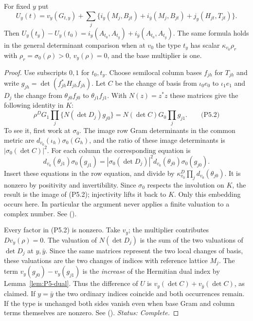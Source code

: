 \begin{proposition}\label{prop:P5-local}
For fixed $y$ put
\[
 U_y(t)=v_y(G_{t,y})
       +\sum_j\{i_y(M_j,B_{jt})+i_{\bar y}(M_j,B_{jt})+j_y(H_{jt},T_{jt})\}.
\]
Then $U_y(t_y)-U_y(t_0)=i_y(A_{t_0},A_{t_y})+i_{\bar y}(A_{t_0},A_{t_y})$.
The same formula holds in the general determinant comparison when at
$v_0$ the type $t_y$ has scalar $\kappa_{v_0}\rho_r$ with
$\rho_r=\sigma_0(\rho)>0$, $v_y(\rho)=0$, and the base multiplier is one.
\end{proposition}
\begin{proof}
Use subscripts $0,1$ for $t_0,t_y$. Choose semilocal column bases
$f_{jh}$ for $T_{jh}$ and write $g_{jh}=\det(f_{jh}^*H_{jh} f_{jh})$.
Let $C$ be the change of basis from $\iota_0e_0$ to $\iota_1e_1$ and
$D_j$ the change from $\theta_{j0}f_{j0}$ to $\theta_{j1}f_{j1}$.
With $N(z)=z^*z$ these matrices give the following identity in $K$:
\[
  \rho^D G_1\prod_j\bigl\{N(\det D_j)g_{j0}\bigr\}
          =N(\det C)G_0\prod_j g_{j1}.                         \qquad\text{(P5.2)}
\]
To see it, first work at $\sigma_0$. The image row Gram determinants in
the common metric are $d_{v_0}(\iota_h)\sigma_0(G_h)$, and the ratio of
these image determinants is $|\sigma_0(\det C)|^2$. For each column the
corresponding equation is
\[
 d_{v_0}(\theta_{j1})\sigma_0(g_{j1})=
 |\sigma_0(\det D_j)|^2d_{v_0}(\theta_{j0})\sigma_0(g_{j0}).
\]
Insert these equations in the row equation, and divide by
$\kappa_{v_0}^D\prod_j d_{v_0}(\theta_{j0})$. It is nonzero by positivity
and invertibility. Since $\sigma_0$ respects the involution on $K$,
the result is the image of (P5.2); injectivity lifts it back to $K$.
Only this embedding occurs here. In particular the argument never applies
a finite valuation to a complex number.
See 
().

Every factor in (P5.2) is nonzero. Take $v_y$; the multiplier contributes
$D v_y(\rho)=0$. The valuation of $N(\det D_j)$ is the sum of the two
valuations of $\det D_j$ at $y,\bar y$. Since the same matrices represent
the two local changes of basis, these valuations are the two changes of
indices with reference lattice $M_j$. The term
$v_y(g_{j0})-v_y(g_{j1})$ is the \emph{increase} of the Hermitian
dual index by Lemma~\ref{lem:P5-dual}. Thus the difference of $U$ is
$v_y(\det C)+v_{\bar y}(\det C)$, as claimed. If $y=\bar y$ the two ordinary
indices coincide and both occurrences remain. If the type is unchanged both
sides vanish even when base Gram and column terms themselves are nonzero.
See 
().
\emph{Status: Complete.}
\end{proof}

